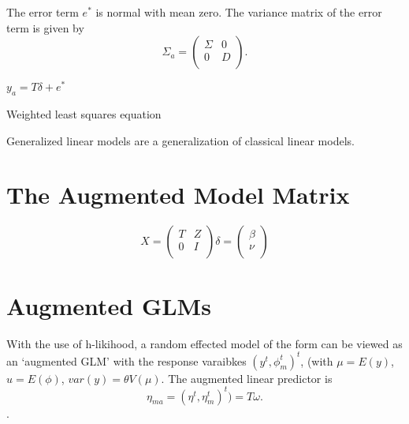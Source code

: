 \documentclass[12pt, a4paper]{article}
\begin{document}




The error term $e^{*}$ is normal with mean zero. The variance matrix of the error term is given by
\begin{equation}
\Sigma_{a} = \left(%
\begin{array}{cc}
  \Sigma & 0 \\
  0 & D \\
\end{array}%
\right).
\end{equation}


$y_{a} = T \delta + e^{*}$


Weighted least squares equation








Generalized linear models are a generalization of classical linear  models.

\section{The Augmented Model Matrix}  %
\begin{equation}
X = \left(%
\begin{array}{cc}
  T & Z \\
  0 & I \\
\end{array}%
\right)
\delta = \left(%
\begin{array}{c}
  \beta  \\
  \nu  \\
\end{array}%
\right)
\end{equation}





\section{Augmented GLMs} %

With the use of h-likihood, a random effected model of the form can be viewed as an `augmented GLM' with the response varaibkes $(y^t, \phi^t_m)^t$, (with $\mu = E(y)$,$ u = E(\phi)$, $var(y) = \theta V (\mu)$.
The augmented linear predictor is \[\eta_{ma}  = (\eta^t, \eta^t_m)^t) = T\omega. \].



\end{document}
